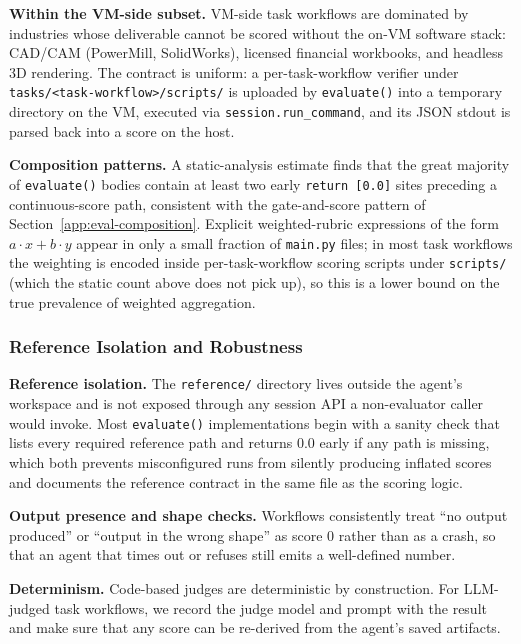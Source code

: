 \documentclass{llmxive}
\begin{document}
\noindent \textbf{Within the VM-side subset.}
VM-side task workflows are dominated by industries whose deliverable cannot be scored without the on-VM software stack: CAD/CAM (PowerMill, SolidWorks), licensed financial workbooks, and headless 3D rendering. The contract is uniform: a per-task-workflow verifier under \texttt{tasks/<task-workflow>/scripts/} is uploaded by \texttt{evaluate()} into a temporary directory on the VM, executed via \texttt{session.run\_command}, and its JSON stdout is parsed back into a score on the host.

\noindent \textbf{Composition patterns.}
A static-analysis estimate finds that the great majority of \texttt{evaluate()} bodies contain at least two early \texttt{return [0.0]} sites preceding a continuous-score path, consistent with the gate-and-score pattern of Section~\ref{app:eval-composition}. Explicit weighted-rubric expressions of the form $a\cdot x + b\cdot y$ appear in only a small fraction of \texttt{main.py} files; in most task workflows the weighting is encoded inside per-task-workflow scoring scripts under \texttt{scripts/} (which the static count above does not pick up), so this is a lower bound on the true prevalence of weighted aggregation.

\subsubsection{Reference Isolation and Robustness}
\label{app:eval-isolation}

\noindent \textbf{Reference isolation.}
The \texttt{reference/} directory lives outside the agent's workspace and is not exposed through any session API a non-evaluator caller would invoke. Most \texttt{evaluate()} implementations begin with a sanity check that lists every required reference path and returns $0.0$ early if any path is missing, which both prevents misconfigured runs from silently producing inflated scores and documents the reference contract in the same file as the scoring logic.

\noindent \textbf{Output presence and shape checks.}
Workflows consistently treat ``no output produced'' or ``output in the wrong shape'' as score $0$ rather than as a crash, so that an agent that times out or refuses still emits a well-defined number.

\noindent \textbf{Determinism.}
Code-based judges are deterministic by construction. For LLM-judged task workflows, we record the judge model and prompt with the result and make sure that any score can be re-derived from the agent's saved artifacts.
\end{document}
